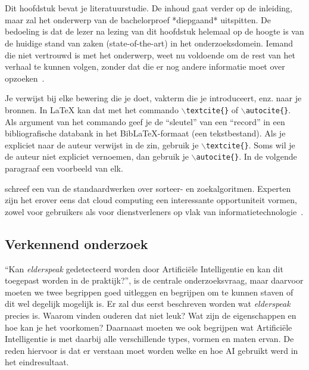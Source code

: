 \chapter{}
\label{ch:stand-van-zaken}




\color{blue}
Dit hoofdstuk bevat je literatuurstudie. De inhoud gaat verder op de inleiding, maar zal het onderwerp van de bachelorproef *diepgaand* uitspitten. De bedoeling is dat de lezer na lezing van dit hoofdstuk helemaal op de hoogte is van de huidige stand van zaken (state-of-the-art) in het onderzoeksdomein. Iemand die niet vertrouwd is met het onderwerp, weet nu voldoende om de rest van het verhaal te kunnen volgen, zonder dat die er nog andere informatie moet over opzoeken~\autocite{Pollefliet2011}.

Je verwijst bij elke bewering die je doet, vakterm die je introduceert, enz. naar je bronnen. In \LaTeX{} kan dat met het commando \texttt{$\backslash${textcite\{\}}} of \texttt{$\backslash${autocite\{\}}}. Als argument van het commando geef je de ``sleutel'' van een ``record'' in een bibliografische databank in het Bib\LaTeX{}-formaat (een tekstbestand). Als je expliciet naar de auteur verwijst in de zin, gebruik je \texttt{$\backslash${}textcite\{\}}.
Soms wil je de auteur niet expliciet vernoemen, dan gebruik je \texttt{$\backslash${}autocite\{\}}. In de volgende paragraaf een voorbeeld van elk.

\textcite{Knuth1998} schreef een van de standaardwerken over sorteer- en zoekalgoritmen. Experten zijn het erover eens dat cloud computing een interessante opportuniteit vormen, zowel voor gebruikers als voor dienstverleners op vlak van informatietechnologie~\autocite{Creeger2009}.

\color{black}

\section{Verkennend onderzoek}
\label{sec:verkennend-onderzoek}
``Kan \textit{elderspeak} gedetecteerd worden door Artificiële Intelligentie en kan dit toegepast worden in de praktijk?'', is de centrale onderzoeksvraag, maar daarvoor moeten we twee begrippen goed uitleggen en begrijpen om te kunnen staven of dit wel degelijk mogelijk is.
Er zal dus eerst beschreven worden wat \textit{elderspeak} precies is. Waarom vinden ouderen dat niet leuk? Wat zijn de eigenschappen en hoe kan je het voorkomen?
Daarnaast moeten we ook begrijpen wat Artificiële Intelligentie is met daarbij alle verschillende types, vormen en maten ervan. De reden hiervoor is dat er verstaan moet worden welke en hoe AI gebruikt werd in het eindresultaat.

